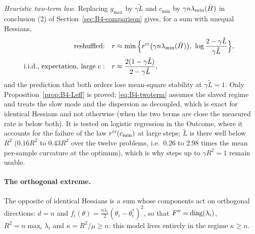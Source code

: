 \noindent \emph{Heuristic two-term law.} Replacing $g_{\max}$ by $\gamma\tilde L$ and $c_{\min}$ by $\gamma n\lambda_{\min}(\bar H)$ in conclusion (2) of Section~\ref{sec:B4-comparison} gives, for a sum with unequal Hessians,
\begin{equation}\label{eq:B4-twoterm}
\begin{aligned}
\text{reshuffled:}\quad& r\approx\min\Big\{r^{\rm rr}\big(\gamma n\lambda_{\min}(\bar H)\big),\ \log\frac{2-\gamma\tilde L}{\gamma\tilde L}\Big\},\\
\text{i.i.d., expectation, large }c:\quad& r\approx\frac{2(1-\gamma\tilde L)}{2-\gamma\tilde L},
\end{aligned}
\end{equation}
and the prediction that both orders lose mean-square stability at $\gamma\tilde L=1$. Only Proposition~\ref{prop:B4-Leff} is proved; \eqref{eq:B4-twoterm} assumes the slaved regime and treats the slow mode and the dispersion as decoupled, which is exact for identical Hessians and not otherwise (when the two terms are close the measured rate is below both). It is tested on logistic regression in the Outcome, where it accounts for the failure of the law $r^{\rm rr}(c_{\min})$ at large steps; $\tilde L$ is there well below $R^2$ ($0.16R^2$ to $0.43R^2$ over the twelve problems, i.e.\ $0.26$ to $2.98$ times the mean per-sample curvature at the optimum), which is why steps up to $\gamma R^2=1$ remain usable.

\paragraph{The orthogonal extreme.} The opposite of identical Hessians is a sum whose components act on orthogonal directions: $d=n$ and $f_i(\theta)=\frac{n\lambda_i}2(\theta_i-\theta^\ast_i)^2$, so that $F''=\operatorname{diag}(\lambda_i)$, $R^2=n\max_i\lambda_i$ and $\kappa=R^2/\mu\ge n$: this model lives entirely in the regime $\kappa\ge n$.

